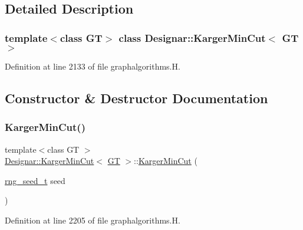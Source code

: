 \subsection{Detailed Description}
\subsubsection*{template$<$class GT$>$\newline
class Designar\+::\+Karger\+Min\+Cut$<$ G\+T $>$}



Definition at line 2133 of file graphalgorithms.\+H.



\subsection{Constructor \& Destructor Documentation}
\mbox{\label{class_designar_1_1_karger_min_cut_ab2b55a4d8b0d64a469cecafeeac8fcf1}} 
\subsubsection{\texorpdfstring{Karger\+Min\+Cut()}{KargerMinCut()}\hspace{0.1cm}{\footnotesize\ttfamily [1/2]}}
{\footnotesize\ttfamily template$<$class GT $>$ \\
\hyperlink{class_designar_1_1_karger_min_cut}{Designar\+::\+Karger\+Min\+Cut}$<$ \hyperlink{demo-buildgraph_8_c_a3001c40d2c31ca87ed96cd7d1334a55e}{GT} $>$\+::\hyperlink{class_designar_1_1_karger_min_cut}{Karger\+Min\+Cut} (\begin{DoxyParamCaption}\item[{\hyperlink{namespace_designar_ad621b5646d45288c5d6a1e1dfe7531a8}{rng\+\_\+seed\+\_\+t}}]{seed }\end{DoxyParamCaption})\hspace{0.3cm}{\ttfamily [inline]}}



Definition at line 2205 of file graphalgorithms.\+H.

\mbox{\label{class_designar_1_1_karger_min_cut_a1f8bce9bd104fb9b6ba7744c58dbf68b}} 
